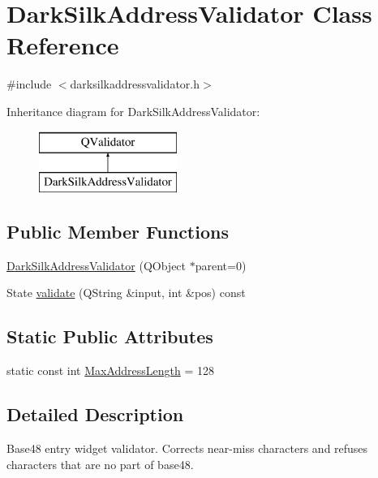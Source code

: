 \hypertarget{class_dark_silk_address_validator}{}\section{Dark\+Silk\+Address\+Validator Class Reference}
\label{class_dark_silk_address_validator}


{\ttfamily \#include $<$darksilkaddressvalidator.\+h$>$}

Inheritance diagram for Dark\+Silk\+Address\+Validator\+:\begin{figure}[H]
\begin{center}
\leavevmode
\includegraphics[height=2.000000cm]{class_dark_silk_address_validator}
\end{center}
\end{figure}
\subsection*{Public Member Functions}
\begin{DoxyCompactItemize}
\item 
\hyperlink{class_dark_silk_address_validator_ab3c14a9bb5c040892b7abc8436f0d03f}{Dark\+Silk\+Address\+Validator} (Q\+Object $\ast$parent=0)
\item 
State \hyperlink{class_dark_silk_address_validator_a82edb3fea291efd97c11ee3f0b2a06a7}{validate} (Q\+String \&input, int \&pos) const 
\end{DoxyCompactItemize}
\subsection*{Static Public Attributes}
\begin{DoxyCompactItemize}
\item 
static const int \hyperlink{class_dark_silk_address_validator_ade0e41d2e163261099b876a880249519}{Max\+Address\+Length} = 128
\end{DoxyCompactItemize}


\subsection{Detailed Description}
Base48 entry widget validator. Corrects near-\/miss characters and refuses characters that are no part of base48. 

